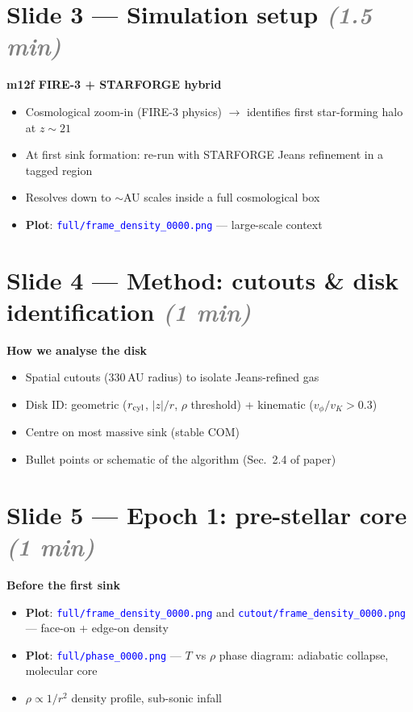 \documentclass[12pt]{article}
\newcommand{\plotref}[1]{\textcolor{blue}{\texttt{#1}}}
\newcommand{\timing}[1]{\textcolor{gray}{\textit{(#1)}}}
\begin{document}
\section*{Slide 3 --- Simulation setup \timing{1.5 min}}

\textbf{m12f FIRE-3 + STARFORGE hybrid}

\begin{itemize}
  \item Cosmological zoom-in (FIRE-3 physics) $\to$ identifies first
        star-forming halo at $z \sim 21$
  \item At first sink formation: re-run with STARFORGE Jeans refinement
        in a tagged region
  \item Resolves down to $\sim$AU scales inside a full cosmological box
  \item \textbf{Plot}: \plotref{full/frame\_density\_0000.png} ---
        large-scale context
\end{itemize}

\section*{Slide 4 --- Method: cutouts \& disk identification \timing{1 min}}

\textbf{How we analyse the disk}

\begin{itemize}
  \item Spatial cutouts (330\,AU radius) to isolate Jeans-refined gas
  \item Disk ID: geometric ($r_{\rm cyl}$, $|z|/r$, $\rho$ threshold)
        + kinematic ($v_\phi / v_K > 0.3$)
  \item Centre on most massive sink (stable COM)
  \item Bullet points or schematic of the algorithm (Sec.~2.4 of paper)
\end{itemize}

\section*{Slide 5 --- Epoch 1: pre-stellar core \timing{1 min}}

\textbf{Before the first sink}

\begin{itemize}
  \item \textbf{Plot}: \plotref{full/frame\_density\_0000.png} and
        \plotref{cutout/frame\_density\_0000.png} --- face-on + edge-on
        density
  \item \textbf{Plot}: \plotref{full/phase\_0000.png} --- $T$ vs
        $\rho$ phase diagram: adiabatic collapse, molecular core
  \item $\rho \propto 1/r^2$ density profile, sub-sonic infall
\end{itemize}
\end{document}
